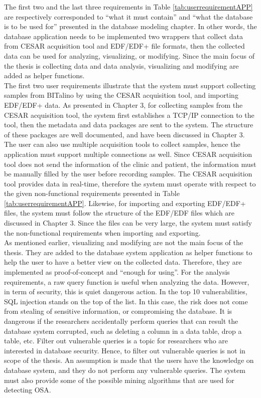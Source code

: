 The first two and the last three requirements in Table \ref{tab:userrequirementAPP} are respectively corresponded to “what it must contain” and “what the database is to be used for” presented in the database modeling chapter. In other words, the database application needs to be implemented two wrappers that collect data from CESAR acquisition tool and EDF/EDF+ file formats, then the collected data can be used for analyzing, visualizing, or modifying. Since the main focus of the thesis is collecting data and data analysis, visualizing and modifying are added as helper functions.\\
The first two user requirements illustrate that the system must support collecting samples from BITalino by using the CESAR acquisition tool, and importing EDF/EDF+ data. As presented in Chapter 3, for collecting samples from the CESAR acquisition tool, the system first establishes a TCP/IP connection to the tool, then the metadata and data packages are sent to the system. The structure of these packages are well documented, and have been discussed in Chapter 3. The user can also use multiple acquisition tools to collect samples, hence the application must support multiple connections as well. Since CESAR acquisition tool does not send the information of the clinic and patient, the information must be manually filled by the user before recording samples. The CESAR acquisition tool provides data in real-time, therefore the system must operate with respect to the given non-functional requirements presented in Table \ref{tab:userrequirementAPP}. Likewise, for importing and exporting EDF/EDF+ files, the system must follow the structure of the EDF/EDF files which are discussed in Chapter 3. Since the files can be very large, the system must satisfy the non-functional requirements when importing and exporting.\\
As mentioned earlier, visualizing and modifying are not the main focus of the thesis. They are added to the database system application as helper functions to help the user to have a better view on the collected data. Therefore, they are implemented as proof-of-concept and “enough for using”. For the analysis requirements, a raw query function is useful when analyzing the data. However, in term of security, this is quiet dangerous action. In the top 10 vulnerabilities, SQL injection stands on the top of the list\citep{OWASP}. In this case, the risk does not come from stealing of sensitive information, or compromising the database. It is dangerous if the researchers accidentally perform queries that can result the database system corrupted, such as deleting a column in a data table, drop a table, etc. Filter out vulnerable queries is a topic for researchers who are interested in database security. Hence, to filter out vulnerable queries is not in scope of the thesis. An assumption is made that the users have the knowledge on database system, and they do not perform any vulnerable queries. The system must also provide some of the possible mining algorithms that are used for detecting OSA.
